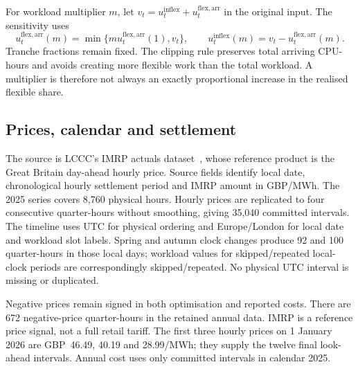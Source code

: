 For workload multiplier $m$, let $v_t=u_t^{\mathrm{inflex}}+u_t^{\mathrm{flex,arr}}$ in the original input. The sensitivity uses
\begin{equation}
u_t^{\mathrm{flex,arr}}(m)=\min\{m u_t^{\mathrm{flex,arr}}(1),v_t\},
\qquad u_t^{\mathrm{inflex}}(m)=v_t-u_t^{\mathrm{flex,arr}}(m).
\end{equation}
Tranche fractions remain fixed. The clipping rule preserves total arriving CPU-hours and avoids creating more flexible work than the total workload. A multiplier is therefore not always an exactly proportional increase in the realised flexible share.



\subsection{Prices, calendar and settlement}
The source is LCCC's IMRP actuals dataset~\cite{lccc_imrp_actuals}, whose reference product is the Great Britain day-ahead hourly price. Source fields identify local date, chronological hourly settlement period and IMRP amount in GBP/MWh. The 2025 series covers 8,760 physical hours. Hourly prices are replicated to four consecutive quarter-hours without smoothing, giving 35,040 committed intervals. The timeline uses UTC for physical ordering and Europe/London for \textcolor{LatestGreen}{local date} and \textcolor{LatestGreen}{workload slot} labels. Spring and autumn clock changes produce 92 and 100 quarter-hours in those local days; workload values for skipped/repeated local-clock periods are correspondingly skipped/repeated. No physical UTC interval is missing or duplicated.

Negative prices remain signed in both optimisation and reported costs. There are 672 negative-price quarter-hours in the retained annual data. IMRP is a \textcolor{LatestGreen}{reference price} signal, not a full retail tariff. The first three hourly prices on 1 January 2026 are GBP~46.49, 40.19 and 28.99/MWh; they supply the twelve final look-ahead intervals. Annual cost uses only committed intervals in calendar 2025.
